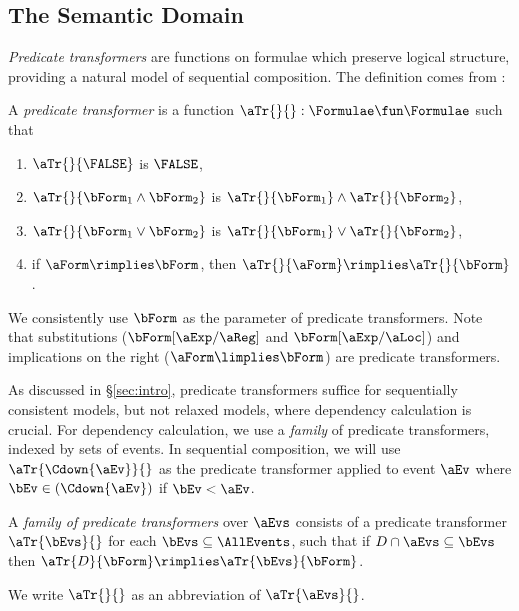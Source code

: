 \subsection{The Semantic Domain} %
\label{sec:pomsets}

\emph{Predicate transformers} are functions on formulae which preserve
logical structure, providing a natural model of sequential composition.
The definition comes from \citet{DBLP:journals/cacm/Dijkstra75}:

\begin{definition}
  \label{def:trans}
  A \emph{predicate transformer} is a %
  function
  $\aTr{}{}:\Formulae\fun\Formulae$ such that
  \begin{multicols}{2}
    \begin{enumerate}[,label=(\textsc{x}\arabic*),ref=\textsc{x}\arabic*]
    \item \label{tr-false}
      $\aTr{}{\FALSE}$ is $\FALSE$,    
    \item \label{tr-and}
      $\aTr{}{\bForm_1\land\bForm_2}$ is $\aTr{}{\bForm_1}\land\aTr{}{\bForm_2}$,    
    \item \label{tr-or}
      $\aTr{}{\bForm_1\lor\bForm_2}$ is $\aTr{}{\bForm_1}\lor\aTr{}{\bForm_2}$, 
    \item \label{tr-implies}
      if $\aForm \rimplies \bForm$, then $\aTr{}{\aForm} \rimplies
      \aTr{}{\bForm}$.
    \end{enumerate}
  \end{multicols}
\end{definition}
\noindent
We consistently use $\bForm$ as the parameter of predicate transformers.
Note that substitutions ($\bForm[\aExp/\aReg]$ and $\bForm[\aExp/\aLoc]$) and
implications on the right ($\aForm\limplies\bForm$) are predicate
transformers.

As discussed in \S\ref{sec:intro}, predicate transformers suffice for
sequentially consistent models, but not relaxed models, where dependency
calculation is crucial.  For dependency calculation, we use a \emph{family}
of predicate transformers, indexed by sets of events. In sequential
composition, we will use $\aTr{\Cdown{\aEv}}{}$ as the predicate transformer
applied to event $\aEv$ where $\bEv\in(\Cdown{\aEv})$ if $\bEv<\aEv$.

\begin{definition}
  \label{def:family}
  A \emph{family of predicate transformers} over $\aEvs$ consists of a
  predicate transformer $\aTr{\bEvs}{}$ for each $\bEvs\subseteq\AllEvents$,
  such that if $\cEvs \cap \aEvs \subseteq \bEvs$ then $\aTr{\cEvs}{\bForm}
  \rimplies \aTr{\bEvs}{\bForm}$.

  We write $\aTr{}{}$ as an abbreviation of $\aTr{\aEvs}{}$.
\end{definition}


